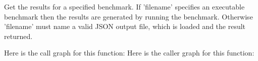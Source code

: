 \begin{DoxyVerb}Get the results for a specified benchmark. If 'filename' specifies
an executable benchmark then the results are generated by running the
benchmark. Otherwise 'filename' must name a valid JSON output file,
which is loaded and the result returned.
\end{DoxyVerb}
 Here is the call graph for this function\+:
Here is the caller graph for this function\+:
